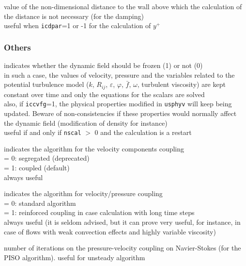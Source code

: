 {value of the non-dimensional distance to the wall above which the
calculation of the distance is not necessary (for the damping)\\
useful when {\tt icdpar}=1 or -1 for the calculation of $y^+$}


\subsubsection{Others}

{indicates whether the dynamic field should be frozen (1) or not (0)\\
in such a case, the values of velocity,
pressure and the variables related to the potential turbulence model
($k$, $R_{ij}$, $\varepsilon$, $\varphi$, $\bar{f}$, $\omega$, turbulent viscosity) are kept
constant over time and only the equations for the scalars are solved\\
also, if {\tt iccvfg}=1, the physical properties modified in \texttt{usphyv} will keep
being updated. Beware of non-consistencies if these properties would normally
affect the dynamic field (modification of density for instance)\\
useful if and only if {\tt nscal} $>$ 0 and the calculation is a restart}

{indicates the algorithm for the velocity components coupling\\
\hspace*{1.3cm}= 0: segregated (deprecated)\\
\hspace*{1.3cm}= 1: coupled (default)\\
always useful
}

{indicates the algorithm for velocity/pressure coupling\\
\hspace*{1.3cm}= 0: standard algorithm\\
\hspace*{1.3cm}= 1: reinforced coupling in case calculation with long
time steps\\
always useful (it is seldom advised, but it can prove very useful, for instance,
in case of flows with weak convection effects and highly variable viscosity)}

{number of iterations on the pressure-velocity coupling on Navier-Stokes (for the PISO algorithm).
useful for unsteady algorithm
}

